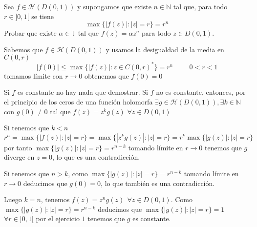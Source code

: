 \begin{ejer}
	Sea $f\in\mathcal{H}(D(0,1))$ y supongamos que existe $n\in\mathbb{N}$ tal que, para todo $r\in ]0,1[$ se tiene
	$$ \max \{ |f(z)| : |z|=r \} = r^n $$
	Probar que existe $\alpha\in\mathbb{T}$ tal que $f(z)=\alpha z^n$ para todo $z\in D(0,1)$.
\end{ejer}
\begin{sol}
	Sabemos que $f\in\mathcal{H}(D(0,1))$ y usamos la desigualdad de la media en $C(0,r)$ 
	$$|f(0)| \leq \max\{ |f(z)| : z\in C(0,r)^{\ast} \} = r^n \hspace{1cm} 0<r<1$$
	tomamos límite con $r\rightarrow 0$ obtenemos que $f(0)=0$
	
	Si $f$ es constante no hay nada que demostrar.
	Si $f$ no es constante, entonces, por el principio de los ceros de una función holomorfa $\exists g\in\mathcal{H}(D(0,1)), \exists k\in\mathbb{N}$ con $g(0) \not=0$ tal que $f(z) = z^kg(z)$ $\forall z\in D(0,1)$
	
	Si tenemos que $k<n$
	$$r^n = \max\{ |f(z)| : |z|=r \} = \max\{ |z^kg(z)| : |z|=r \} = r^k \max\{ |g(z)| : |z|=r \}$$
	por tanto
	$\max\{ |g(z)| : |z|=r \} = r^{n-k}$ tomando límite en $r\rightarrow0$ tenemos que $g$ diverge en $z=0$, lo que es una contradicción.
	
	Si tenemos que $n>k$,
	como $\max\{ |g(z)| : |z|=r \} = r^{n-k}$ tomando límite en $r\rightarrow 0$ deducimos que $g(0)=0$, lo que también es una contradicción.
	
	Luego $k=n$, tenemos $f(z)=z^ng(z) \ \ \forall z\in D(0,1)$. Como $\max\{ |g(z)| : |z|=r \} = r^{n-k}$ deducimos que $\max\{ |g(z)| : |z|=r \} = 1$ $\forall r\in]0,1[$
	por el ejercicio $1$ tenemos que $g$ es constante.
	
	
		

	
	
	
	
	
	
\end{sol}



